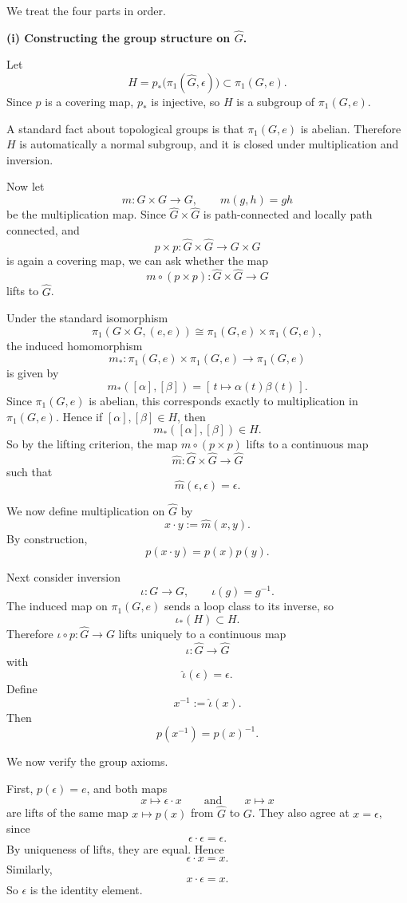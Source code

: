 \begin{solution}
We treat the four parts in order.

\textbf{(i) Constructing the group structure on \(\widehat{G}\).}

Let
\[
H=p_*\bigl(\pi_1(\widehat{G},\epsilon)\bigr)\subset \pi_1(G,e).
\]
Since \(p\) is a covering map, \(p_*\) is injective, so \(H\) is a subgroup of \(\pi_1(G,e)\).

A standard fact about topological groups is that \(\pi_1(G,e)\) is abelian. Therefore \(H\) is automatically a normal subgroup, and it is closed under multiplication and inversion.

Now let
\[
m:G\times G\to G,
\qquad
m(g,h)=gh
\]
be the multiplication map. Since \(\widehat{G}\times \widehat{G}\) is path-connected and locally path connected, and
\[
p\times p:\widehat{G}\times \widehat{G}\to G\times G
\]
is again a covering map, we can ask whether the map
\[
m\circ (p\times p):\widehat{G}\times \widehat{G}\to G
\]
lifts to \(\widehat{G}\).

Under the standard isomorphism
\[
\pi_1(G\times G,(e,e))\cong \pi_1(G,e)\times \pi_1(G,e),
\]
the induced homomorphism
\[
m_*:\pi_1(G,e)\times \pi_1(G,e)\to \pi_1(G,e)
\]
is given by
\[
m_*([\alpha],[\beta])=[\,t\mapsto \alpha(t)\beta(t)\,].
\]
Since \(\pi_1(G,e)\) is abelian, this corresponds exactly to multiplication in \(\pi_1(G,e)\). Hence if \([\alpha],[\beta]\in H\), then
\[
m_*([\alpha],[\beta])\in H.
\]
So by the lifting criterion, the map \(m\circ (p\times p)\) lifts to a continuous map
\[
\widehat{m}:\widehat{G}\times \widehat{G}\to \widehat{G}
\]
such that
\[
\widehat{m}(\epsilon,\epsilon)=\epsilon.
\]

We now define multiplication on \(\widehat{G}\) by
\[
x\cdot y:=\widehat{m}(x,y).
\]
By construction,
\[
p(x\cdot y)=p(x)p(y).
\]

Next consider inversion
\[
\iota:G\to G,
\qquad
\iota(g)=g^{-1}.
\]
The induced map on \(\pi_1(G,e)\) sends a loop class to its inverse, so
\[
\iota_*(H)\subset H.
\]
Therefore \(\iota\circ p:\widehat{G}\to G\) lifts uniquely to a continuous map
\[
\widehat{\iota}:\widehat{G}\to \widehat{G}
\]
with
\[
\widehat{\iota}(\epsilon)=\epsilon.
\]
Define
\[
x^{-1}:=\widehat{\iota}(x).
\]
Then
\[
p(x^{-1})=p(x)^{-1}.
\]

We now verify the group axioms.

First, \(p(\epsilon)=e\), and both maps
\[
x\mapsto \epsilon\cdot x
\qquad\text{and}\qquad
x\mapsto x
\]
are lifts of the same map \(x\mapsto p(x)\) from \(\widehat{G}\) to \(G\). They also agree at \(x=\epsilon\), since
\[
\epsilon\cdot \epsilon=\epsilon.
\]
By uniqueness of lifts, they are equal. Hence
\[
\epsilon\cdot x=x.
\]
Similarly,
\[
x\cdot \epsilon=x.
\]
So \(\epsilon\) is the identity element.


\end{solution}
